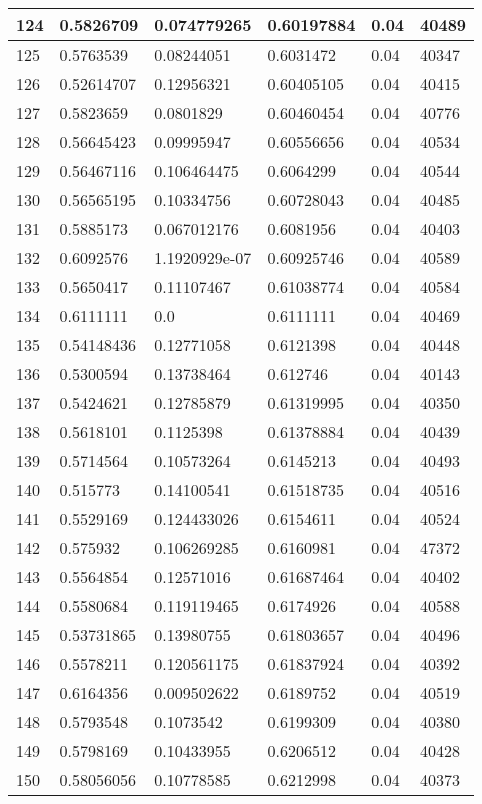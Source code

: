 \begin{longtable}{|l|l|l|l|l|l|}
124 & 0.5826709 & 0.074779265 & 0.60197884 & 0.04 & 40489 \\ \hline 
125 & 0.5763539 & 0.08244051 & 0.6031472 & 0.04 & 40347 \\ \hline 
126 & 0.52614707 & 0.12956321 & 0.60405105 & 0.04 & 40415 \\ \hline 
127 & 0.5823659 & 0.0801829 & 0.60460454 & 0.04 & 40776 \\ \hline 
128 & 0.56645423 & 0.09995947 & 0.60556656 & 0.04 & 40534 \\ \hline 
129 & 0.56467116 & 0.106464475 & 0.6064299 & 0.04 & 40544 \\ \hline 
130 & 0.56565195 & 0.10334756 & 0.60728043 & 0.04 & 40485 \\ \hline 
131 & 0.5885173 & 0.067012176 & 0.6081956 & 0.04 & 40403 \\ \hline 
132 & 0.6092576 & 1.1920929e-07 & 0.60925746 & 0.04 & 40589 \\ \hline 
133 & 0.5650417 & 0.11107467 & 0.61038774 & 0.04 & 40584 \\ \hline 
134 & 0.6111111 & 0.0 & 0.6111111 & 0.04 & 40469 \\ \hline 
135 & 0.54148436 & 0.12771058 & 0.6121398 & 0.04 & 40448 \\ \hline 
136 & 0.5300594 & 0.13738464 & 0.612746 & 0.04 & 40143 \\ \hline 
137 & 0.5424621 & 0.12785879 & 0.61319995 & 0.04 & 40350 \\ \hline 
138 & 0.5618101 & 0.1125398 & 0.61378884 & 0.04 & 40439 \\ \hline 
139 & 0.5714564 & 0.10573264 & 0.6145213 & 0.04 & 40493 \\ \hline 
140 & 0.515773 & 0.14100541 & 0.61518735 & 0.04 & 40516 \\ \hline 
141 & 0.5529169 & 0.124433026 & 0.6154611 & 0.04 & 40524 \\ \hline 
142 & 0.575932 & 0.106269285 & 0.6160981 & 0.04 & 47372 \\ \hline 
143 & 0.5564854 & 0.12571016 & 0.61687464 & 0.04 & 40402 \\ \hline 
144 & 0.5580684 & 0.119119465 & 0.6174926 & 0.04 & 40588 \\ \hline 
145 & 0.53731865 & 0.13980755 & 0.61803657 & 0.04 & 40496 \\ \hline 
146 & 0.5578211 & 0.120561175 & 0.61837924 & 0.04 & 40392 \\ \hline 
147 & 0.6164356 & 0.009502622 & 0.6189752 & 0.04 & 40519 \\ \hline 
148 & 0.5793548 & 0.1073542 & 0.6199309 & 0.04 & 40380 \\ \hline 
149 & 0.5798169 & 0.10433955 & 0.6206512 & 0.04 & 40428 \\ \hline 
150 & 0.58056056 & 0.10778585 & 0.6212998 & 0.04 & 40373 \\ \hline 
\end{longtable}